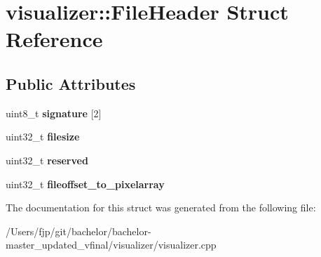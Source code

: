\hypertarget{structvisualizer_1_1_file_header}{}\section{visualizer\+:\+:File\+Header Struct Reference}
\label{structvisualizer_1_1_file_header}
\subsection*{Public Attributes}
\begin{DoxyCompactItemize}
\item 
\mbox{\label{structvisualizer_1_1_file_header_a0a34468b872f064c94cefc09f2945c6e}} 
uint8\+\_\+t {\bfseries signature} \mbox{[}2\mbox{]}
\item 
\mbox{\label{structvisualizer_1_1_file_header_ad79e04a6e593e9448a151049ef8290ab}} 
uint32\+\_\+t {\bfseries filesize}
\item 
\mbox{\label{structvisualizer_1_1_file_header_abe8a37ffc28ff244e92680e8563537c5}} 
uint32\+\_\+t {\bfseries reserved}
\item 
\mbox{\label{structvisualizer_1_1_file_header_ab24f1ce618c07cdfd8afc2b3d4455d3b}} 
uint32\+\_\+t {\bfseries fileoffset\+\_\+to\+\_\+pixelarray}
\end{DoxyCompactItemize}


The documentation for this struct was generated from the following file\+:\begin{DoxyCompactItemize}
\item 
/\+Users/fjp/git/bachelor/bachelor-\/master\+\_\+updated\+\_\+vfinal/visualizer/visualizer.\+cpp\end{DoxyCompactItemize}
